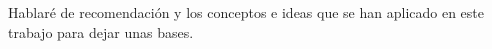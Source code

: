 Hablaré de recomendación y los conceptos e ideas que se han aplicado en este trabajo para dejar unas bases.